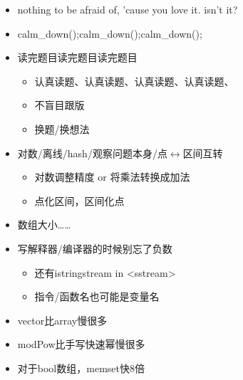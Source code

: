 \begin{itemize}
\item nothing to be afraid of, 'cause you love it. isn't it?
\item calm\_down();calm\_down();calm\_down();
\item 读完题目读完题目读完题目
\begin{itemize}
\item 认真读题、认真读题、认真读题、认真读题、
\item 不盲目跟版
\item 换题/换想法
\end{itemize}
\item 对数/离线/hash/观察问题本身/点$\leftrightarrow$区间互转
\begin{itemize}
\item 对数调整精度 or 将乘法转换成加法
\item 点化区间，区间化点
\end{itemize}
\item 数组大小……
\item 写解释器/编译器的时候别忘了负数
\begin{itemize}
\item 还有istringstream in <sstream>
\item 指令/函数名也可能是变量名
\end{itemize}
\item vector比array慢很多
\item modPow比手写快速幂慢很多
\item 对于bool数组，memset快8倍
\end{itemize}
